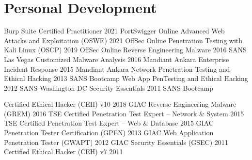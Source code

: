 

\section{Personal Development}

  
        
        \titleYearOrgPlace
            {Burp Suite Certified Practitioner}
            {2021}
            {PortSwigger}
            {Online}
        \titleYearOrgPlace
            {Advanced Web Attacks and Exploitation (OSWE)}
            {2021}
            {OffSec}
            {Online}
        \titleYearOrgPlace
            {Penetration Testing with Kali Linux (OSCP)}
            {2019}
            {OffSec}
            {Online}
        \titleYearOrgPlace
            {Reverse Engineering Malware}
            {2016}
            {SANS}
            {Las Vegas}
        \titleYearOrgPlace
            {Customized Malware Analysis}
            {2016}
            {Mandiant}
            {Ankara}
        \titleYearOrgPlace
            {Enterprise Incident Response}
            {2015}
            {Mandiant}
            {Ankara}
        \titleYearOrgPlace
            {Network Penetration Testing and Ethical Hacking}
            {2013}
            {SANS}
            {Bootcamp}
        \titleYearOrgPlace
            {Web App PenTesting and Ethical Hacking}
            {2012}
            {SANS}
            {Washington DC}        
        \titleYearOrgPlace
            {Security Essentials}
            {2011}
            {SANS}
            {Bootcamp}

    \itemizeCVEnd



        \titleYear
            {Certified Ethical Hacker (CEH) v10}
            {2018}
        \titleYear
            {GIAC Reverse Engineering Malware (GREM)}
            {2016}
        \titleYear
            {TSE Certified Penetration Test Expert – Network \& System}
            {2015}
        \titleYear
            {TSE Certified Penetration Test Expert – Web \& Database}
            {2015}
        \titleYear
            {GIAC Penetration Tester Certification (GPEN)}
            {2013}
        \titleYear
            {GIAC Web Application Penetration Tester (GWAPT)}
            {2012}
        \titleYear
            {GIAC Security Essentials (GSEC)}
            {2011}
        \titleYear
            {Certified Ethical Hacker (CEH) v7}
            {2011}
  
